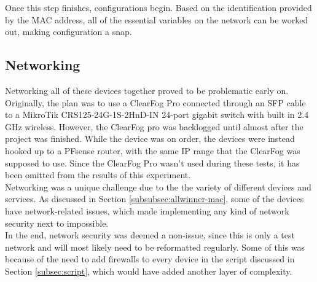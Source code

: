 \documentclass[12pt]{spieman}  %
\begin{document}
Once this step finishes, configurations begin. Based on the identification provided by the MAC address, all of the essential variables on the network can be worked out, making configuration a snap.

\subsection{Networking}
\label{subsec:network}

Networking all of these devices together proved to be problematic early on. Originally, the plan was to use a ClearFog Pro connected through an SFP cable to a MikroTik CRS125-24G-1S-2HnD-IN 24-port gigabit switch with built in 2.4 GHz wireless. However, the ClearFog pro was backlogged until almost after the project was finished. While the device was on order, the devices were instead hooked up to a PFsense router, with the same IP range that the ClearFog was supposed to use. Since the ClearFog Pro wasn't used during these tests, it has been omitted from the results of this experiment.\\

Networking was a unique challenge due to the the variety of different devices and services. As discussed in Section \ref{subsubsec:allwinner-mac}, some of the devices have network-related issues, which made implementing any kind of network security next to impossible.\\

In the end, network security was deemed a non-issue, since this is only a test network and will most likely need to be reformatted regularly. Some of this was because of the need to add firewalls to every device in the script discussed in Section \ref{subsec:script}, which would have added another layer of complexity.
\end{document}
